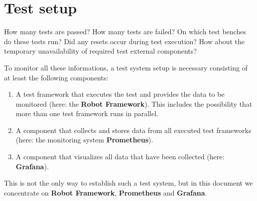 %



%

\section{Test setup}

How many tests are passed? How many tests are failed? On which test benches do these tests run? Did any resets occur during test execution?
How about the temporary unavailability of required test external components?

To monitor all these informations, a test system setup is necessary consisting of at least the following components:

\begin{enumerate}
   \item A test framework that executes the test and provides the data to be monitored (here: the \textbf{Robot Framework}).
         This includes the possibility that more than one test framework runs in parallel.

   \item A component that collects and stores data from all executed test frameworks (here: the monitoring system \textbf{Prometheus}).

   \item A component that visualizes all data that have been collected (here: \textbf{Grafana}).
\end{enumerate}

This is not the only way to establish such a test system, but in this document we concentrate on \textbf{Robot Framework}, \textbf{Prometheus} and \textbf{Grafana}.



